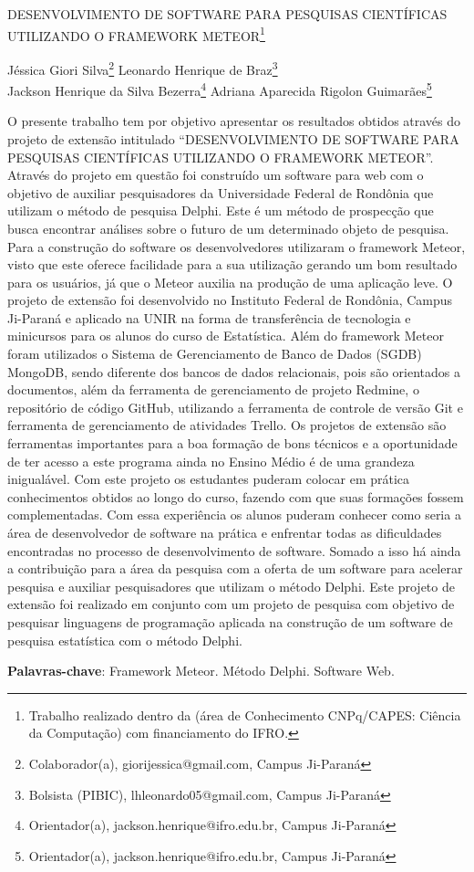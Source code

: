 \documentclass[article,12pt,onesidea,4paper,english,brazil]{abntex2}
\begin{document}
	
	
	\frenchspacing 
	
	\begin{center}
		\LARGE DESENVOLVIMENTO DE SOFTWARE PARA PESQUISAS CIENTÍFICAS UTILIZANDO O FRAMEWORK METEOR\footnote{Trabalho realizado dentro da (área de Conhecimento CNPq/CAPES: Ciência da Computação) com financiamento do IFRO.}
		
		\normalsize
		Jéssica Giori Silva\footnote{Colaborador(a), giorijessica@gmail.com, Campus Ji-Paraná} 
		Leonardo Henrique de Braz\footnote{Bolsista (PIBIC), lhleonardo05@gmail.com, Campus Ji-Paraná} \\
		Jackson Henrique da Silva Bezerra\footnote{Orientador(a), jackson.henrique@ifro.edu.br, Campus Ji-Paraná} 
		Adriana Aparecida Rigolon Guimarães\footnote{Orientador(a), jackson.henrique@ifro.edu.br, Campus Ji-Paraná } 
	\end{center}
	
	\noindent O presente trabalho tem por objetivo apresentar os resultados obtidos através do projeto de extensão intitulado “DESENVOLVIMENTO DE SOFTWARE PARA PESQUISAS CIENTÍFICAS UTILIZANDO O FRAMEWORK METEOR”. Através do projeto em questão foi construído um software para web com o objetivo de auxiliar pesquisadores da Universidade Federal de Rondônia que utilizam o método de pesquisa Delphi. Este é um método de prospecção que busca encontrar análises sobre o futuro de um determinado objeto de pesquisa. Para a construção do software os desenvolvedores utilizaram o framework Meteor, visto que este oferece facilidade para a sua utilização gerando um bom resultado para os usuários, já que o Meteor auxilia na produção de uma aplicação leve. O projeto de extensão foi desenvolvido no Instituto Federal de Rondônia, Campus Ji-Paraná e aplicado na UNIR na forma de transferência de tecnologia e minicursos para os alunos do curso de Estatística. Além do framework Meteor foram utilizados o Sistema de Gerenciamento de Banco de Dados (SGDB) MongoDB, sendo diferente dos bancos de dados relacionais, pois são orientados a documentos, além da ferramenta de gerenciamento de projeto Redmine, o repositório de código GitHub, utilizando a ferramenta de controle de versão Git e ferramenta de gerenciamento de atividades Trello. Os projetos de extensão são ferramentas importantes para a boa formação de bons técnicos e a oportunidade de ter acesso a este programa ainda no Ensino Médio é de uma grandeza inigualável. Com este projeto os estudantes puderam colocar em prática conhecimentos obtidos ao longo do curso, fazendo com que suas formações fossem complementadas. Com essa experiência os alunos puderam conhecer como seria a área de desenvolvedor de software na prática e enfrentar todas as dificuldades encontradas no processo de desenvolvimento de software. Somado a isso há ainda a contribuição para a área da pesquisa com a oferta de um software para acelerar pesquisa e auxiliar pesquisadores que utilizam o método Delphi. Este projeto de extensão foi realizado em conjunto com um projeto de pesquisa com objetivo de pesquisar linguagens de programação aplicada na construção de um software de pesquisa estatística com o método Delphi.
	
	\vspace{\onelineskip}
	
	\noindent
	\textbf{Palavras-chave}: Framework Meteor. Método Delphi. Software Web.
	
\end{document}
